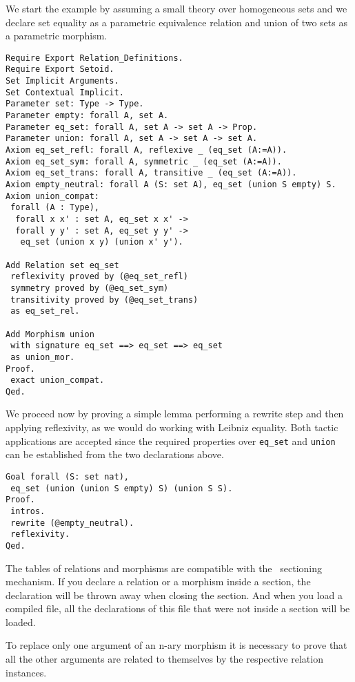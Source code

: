 \begin{cscexample}
We start the example by assuming a small theory over homogeneous sets and
we declare set equality as a parametric equivalence relation and
union of two sets as a parametric morphism.
\begin{verbatim}
Require Export Relation_Definitions.
Require Export Setoid.
Set Implicit Arguments.
Set Contextual Implicit.
Parameter set: Type -> Type.
Parameter empty: forall A, set A.
Parameter eq_set: forall A, set A -> set A -> Prop.
Parameter union: forall A, set A -> set A -> set A.
Axiom eq_set_refl: forall A, reflexive _ (eq_set (A:=A)).
Axiom eq_set_sym: forall A, symmetric _ (eq_set (A:=A)).
Axiom eq_set_trans: forall A, transitive _ (eq_set (A:=A)).
Axiom empty_neutral: forall A (S: set A), eq_set (union S empty) S.
Axiom union_compat:
 forall (A : Type),
  forall x x' : set A, eq_set x x' ->
  forall y y' : set A, eq_set y y' ->
   eq_set (union x y) (union x' y').

Add Relation set eq_set
 reflexivity proved by (@eq_set_refl)
 symmetry proved by (@eq_set_sym)
 transitivity proved by (@eq_set_trans)
 as eq_set_rel.

Add Morphism union
 with signature eq_set ==> eq_set ==> eq_set
 as union_mor.
Proof.
 exact union_compat.
Qed.
\end{verbatim}

We proceed now by proving a simple lemma performing a rewrite step
and then applying reflexivity, as we would do working with Leibniz
equality. Both tactic applications are accepted
since the required properties over \texttt{eq\_set} and
\texttt{union} can be established from the two declarations above.

\begin{verbatim}
Goal forall (S: set nat),
 eq_set (union (union S empty) S) (union S S).
Proof.
 intros.
 rewrite (@empty_neutral).
 reflexivity.
Qed.
\end{verbatim}
\end{cscexample}

The tables of relations and morphisms are compatible with the \Coq\ 
sectioning mechanism. If you declare a relation or a morphism inside a section,
the declaration will be thrown away when closing the section.
And when you load a compiled file, all the declarations
of this file that were not inside a section will be loaded.

To replace only one argument of an n-ary morphism it is necessary to prove
that all the other arguments are related to themselves by the respective
relation instances.

